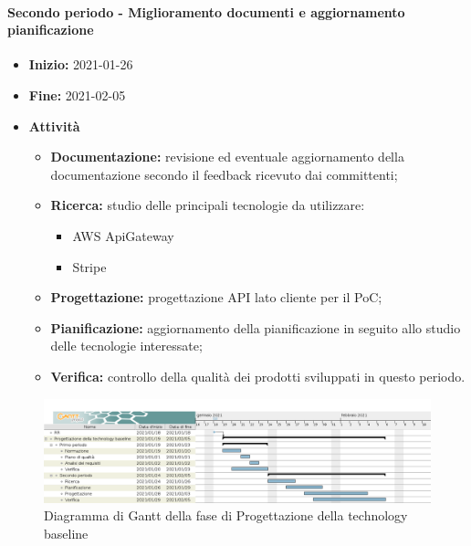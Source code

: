 \paragraph[Primo periodo]{Secondo periodo - \textnormal{Miglioramento documenti e aggiornamento pianificazione}}
\begin{itemize}
    \item [] \textbf{Inizio:} 2021-01-26
    \item [] \textbf{Fine:} 2021-02-05
    \item [] \textbf{Attività}
          \begin{itemize}
              \item \textbf{Documentazione:} revisione ed eventuale aggiornamento della documentazione secondo il feedback ricevuto dai committenti;
              \item \textbf{Ricerca:} studio delle principali tecnologie da utilizzare:
                    \begin{itemize}
                        \item AWS ApiGateway
                        \item Stripe
                    \end{itemize}
              \item \textbf{Progettazione:} progettazione API lato cliente per il PoC;
              \item \textbf{Pianificazione:} aggiornamento della pianificazione in seguito allo studio delle tecnologie interessate;
              \item \textbf{Verifica:} controllo della qualità dei prodotti sviluppati in questo periodo.
          \end{itemize}
\end{itemize}

\begin{figure}[H]
    \centering
    \includegraphics[width=1\linewidth]{res/images/pianificazione/progettazione_della_technology_baseline.png}
    \caption{Diagramma di Gantt della fase di Progettazione della technology baseline}
    \label{fig:_Gantt progettazione della technology baseline}
\end{figure}

